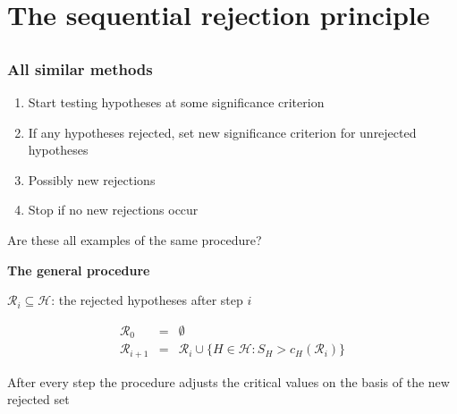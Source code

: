\section{The sequential rejection principle}
\subsection{}
\begin{frame}
\frametitle{All similar methods}


\begin{enumerate}
\item Start testing hypotheses at some significance criterion
\item If any hypotheses rejected, set new significance criterion for unrejected hypotheses
\item Possibly new rejections
\item Stop if no new rejections occur
\end{enumerate}

\bigskip
\textcolor{cambridgedarkorange}{Are these all examples of the same procedure?}
\bigskip


\textcolor{cambridgedarkorange}{\textbf{The general procedure}}

\bigskip


$\mathcal{R}_{i}\subseteq \mathcal{H}$: the rejected hypotheses after step $i$

\begin{eqnarray*}
\mathcal{R}_{0} &=& \emptyset\\
\mathcal{R}_{i+1} &=& \mathcal{R}_{i} \cup \{H \in \mathcal{H}: S_{H} > c_H(\mathcal{R}_{i})\} 
\end{eqnarray*}

After every step the procedure adjusts the critical values on the basis of the new rejected set

\end{frame}
